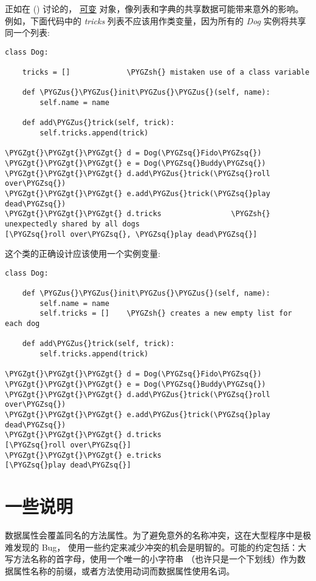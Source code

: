 \documentclass[a4paper,10pt,english]{sphinxmanual}
\def\PYGZus{\char`\_}
\def\PYGZgt{\char`\>}
\def\PYGZsh{\char`\#}
\def\PYGZsq{\char`\'}
\renewcommand\PYGZsq{\textquotesingle}
\begin{document}
正如在 {\hyperref[classes:tut-object]{\emph{}}} () 讨论的， \href{https://docs.python.org/3/glossary.html\#term-mutable}{可变} 对象，像列表和字典的共享数据可能带来意外的影响。
例如，下面代码中的 \emph{tricks} 列表不应该用作类变量，因为所有的 \emph{Dog}  实例将共享同一个列表:

\begin{Verbatim}[commandchars=\\\{\}]
class Dog:

    tricks = []             \PYGZsh{} mistaken use of a class variable

    def \PYGZus{}\PYGZus{}init\PYGZus{}\PYGZus{}(self, name):
        self.name = name

    def add\PYGZus{}trick(self, trick):
        self.tricks.append(trick)

\PYGZgt{}\PYGZgt{}\PYGZgt{} d = Dog(\PYGZsq{}Fido\PYGZsq{})
\PYGZgt{}\PYGZgt{}\PYGZgt{} e = Dog(\PYGZsq{}Buddy\PYGZsq{})
\PYGZgt{}\PYGZgt{}\PYGZgt{} d.add\PYGZus{}trick(\PYGZsq{}roll over\PYGZsq{})
\PYGZgt{}\PYGZgt{}\PYGZgt{} e.add\PYGZus{}trick(\PYGZsq{}play dead\PYGZsq{})
\PYGZgt{}\PYGZgt{}\PYGZgt{} d.tricks                \PYGZsh{} unexpectedly shared by all dogs
[\PYGZsq{}roll over\PYGZsq{}, \PYGZsq{}play dead\PYGZsq{}]
\end{Verbatim}

这个类的正确设计应该使用一个实例变量:

\begin{Verbatim}[commandchars=\\\{\}]
class Dog:

    def \PYGZus{}\PYGZus{}init\PYGZus{}\PYGZus{}(self, name):
        self.name = name
        self.tricks = []    \PYGZsh{} creates a new empty list for each dog

    def add\PYGZus{}trick(self, trick):
        self.tricks.append(trick)

\PYGZgt{}\PYGZgt{}\PYGZgt{} d = Dog(\PYGZsq{}Fido\PYGZsq{})
\PYGZgt{}\PYGZgt{}\PYGZgt{} e = Dog(\PYGZsq{}Buddy\PYGZsq{})
\PYGZgt{}\PYGZgt{}\PYGZgt{} d.add\PYGZus{}trick(\PYGZsq{}roll over\PYGZsq{})
\PYGZgt{}\PYGZgt{}\PYGZgt{} e.add\PYGZus{}trick(\PYGZsq{}play dead\PYGZsq{})
\PYGZgt{}\PYGZgt{}\PYGZgt{} d.tricks
[\PYGZsq{}roll over\PYGZsq{}]
\PYGZgt{}\PYGZgt{}\PYGZgt{} e.tricks
[\PYGZsq{}play dead\PYGZsq{}]
\end{Verbatim}


\section{一些说明}
\label{classes:tut-remarks}\label{classes:id11}
数据属性会覆盖同名的方法属性。为了避免意外的名称冲突，这在大型程序中是极难发现的 Bug，
使用一些约定来减少冲突的机会是明智的。可能的约定包括：大写方法名称的首字母，使用一个唯一的小字符串
（也许只是一个下划线）作为数据属性名称的前缀，或者方法使用动词而数据属性使用名词。
\end{document}
